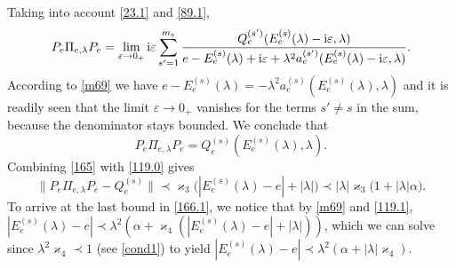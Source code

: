 \documentclass[letterpaper,onecolumn,11pt,accepted=2021-12-09]{quantumarticle}
\numberwithin{equation}{section}
\newcommand{\Qes}{Q_e^{(s)}}
\renewcommand{\i}{{\rm i}}
\begin{document}
Taking into account \eqref{23.1} and \eqref{89.1},
\begin{equation}
	P_e \Pi_{e,\lambda}P_e = \lim_{\varepsilon\rightarrow 0_+}\i \varepsilon \sum_{s'=1}^{m_e} \frac{Q_e^{(s')}(E_e^{(s)}(\lambda) -\i\varepsilon, \lambda)}{e-E_e^{(s)}(\lambda) +\i\varepsilon+\lambda^2 a_e^{(s')}(E_e^{(s)}(\lambda)-\i\varepsilon, \lambda)}.
	\label{164}
\end{equation}
According to \eqref{m69} we have $e-E_e^{(s)}(\lambda) = -\lambda^2 a_e^{(s)}(E_e^{(s)}(\lambda), \lambda)$ and it is readily seen that the limit $\varepsilon\rightarrow 0_+$ vanishes for the terms $s'\neq s$ in the sum, because the denominator stays bounded. We conclude that 
\begin{equation}
P_e \Pi_{e,\lambda}P_e = Q_e^{(s)}(E_e^{(s)}(\lambda), \lambda).
\label{165}
\end{equation}
Combining \eqref{165} with \eqref{119.0} gives
\begin{equation}
\|P_e \Pi_{e,\lambda}P_e - \Qes\|\prec \varkappa_3\big( |E_e^{(s)}(\lambda)-e|+|\lambda|\big)\prec |\lambda| \varkappa_3 \big(1+|\lambda|\alpha\big).
\label{166.1} 
\end{equation}
To arrive at the last bound in \eqref{166.1}, we notice that by \eqref{m69} and \eqref{119.1},  $|E_e^{(s)}(\lambda)-e|\prec \lambda^2(\alpha+\varkappa_4(|E_e^{(s)}(\lambda)-e|+|\lambda| ))$, which we can solve since $\lambda^2\varkappa_4\prec 1$ (see \eqref{cond1}) to yield $|E_e^{(s)}(\lambda)-e|\prec \lambda^2(\alpha+|\lambda|\varkappa_4)$. 
\end{document}
